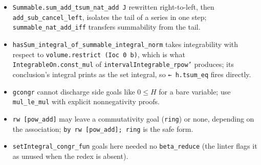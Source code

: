 \documentclass[11pt]{article}
\begin{document}
\begin{itemize}
\item \texttt{Summable.sum\_add\_tsum\_nat\_add J} rewritten right-to-left, then
\texttt{add\_sub\_cancel\_left}, isolates the tail of a series in one step;
\texttt{summable\_nat\_add\_iff} transfers summability from the tail.
\item \texttt{hasSum\_integral\_of\_summable\_integral\_norm} takes integrability with respect to
\texttt{volume.restrict (Ioc 0 b)}, which is what \texttt{IntegrableOn.const\_mul} of
\texttt{intervalIntegrable\_rpow'} produces; its conclusion's integral prints as the set integral,
so \texttt{← h.tsum\_eq} fires directly.
\item \texttt{gcongr} cannot discharge side goals like $0\le H$ for a bare variable; use
\texttt{mul\_le\_mul} with explicit nonnegativity proofs.
\item \texttt{rw [pow\_add]} may leave a commutativity goal (\texttt{ring}) or none, depending on
the association; \texttt{by rw [pow\_add]; ring} is the safe form.
\item \texttt{setIntegral\_congr\_fun} goals here needed no \texttt{beta\_reduce} (the linter flags
it as unused when the redex is absent).
\end{itemize}
\end{document}
